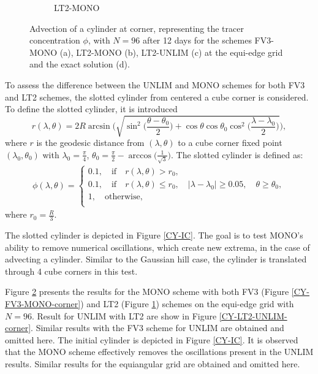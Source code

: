 \documentclass[preprint,12pt]{elsarticle}
\begin{document}
\begin{linenumbers}
\begin{figure}[!htb]
\begin{subfigure}{0.45\textwidth}
		\caption{LT2-MONO\label{CY-LT2-MONO-corner}}
	\end{subfigure}
	\caption{Advection of a cylinder at corner, representing the tracer concentration $\phi$, with $N= 96$ after 12 days for the schemes FV3-MONO (a), LT2-MONO (b), LT2-UNLIM (c) at the equi-edge grid and the exact solution (d).}
	\label{CY-corner}
\end{figure}
To assess the difference between the UNLIM and MONO schemes for both FV3 and LT2 schemes, the slotted cylinder from \cite{nair:2010} centered a cube corner is considered.
To define the slotted cylinder, it is introduced
\begin{equation}
	r(\lambda, \theta)=2R \arcsin{\bigg(
		\sqrt{\sin^2{\bigg(\frac{\theta-\theta_0}{2}\bigg)} + \cos{\theta}\cos{\theta_0}\cos^2{\bigg(\frac{\lambda-\lambda_0}{2}\bigg)}}\bigg)},
\end{equation}
where $r$ is the geodesic distance from $(\lambda, \theta)$ to a cube corner fixed point  $(\lambda_0, \theta_0)$ with 
$\lambda_0 =\frac{\pi}{4}$, $\theta_0= \frac{\pi}{2}-\arccos{\big(\frac{1}{\sqrt{3}}\big)}$.
The slotted cylinder is defined as:
\begin{align}
	\label{slotted-cylinder}
	\phi(\lambda,\theta) =
	\begin{cases}
		0.1, \quad \text{if} \quad r(\lambda,\theta) > r_0,\\
		0.1, \quad \text{if} \quad r(\lambda,\theta) \le r_0, \quad
		|\lambda-\lambda_0| \ge 0.05, \quad \theta\ge\theta_0,\\
		1, \quad \text{otherwise},\\
	\end{cases}
\end{align}
where $r_0=\frac{R}{3}$.

The slotted cylinder is depicted in Figure \ref{CY-IC}.
The goal is to test MONO's ability to remove numerical oscillations, which create new extrema, in the case of advecting a cylinder.
Similar to the Gaussian hill case, the cylinder is translated through 4 cube corners in this test.

Figure \ref{CY-corner} presents the results for the MONO  scheme with both FV3 (Figure \ref{CY-FV3-MONO-corner}) and LT2 (Figure \ref{CY-LT2-MONO-corner}) schemes on the equi-edge grid with $N=96$.
Result for UNLIM with LT2 are show in Figure \ref{CY-LT2-UNLIM-corner}.
Similar results with the FV3 scheme for UNLIM are obtained and omitted here.
The initial cylinder is depicted in Figure \ref{CY-IC}.
It is observed that the MONO scheme effectively removes the oscillations present in the UNLIM results.
Similar results for the equiangular grid are obtained and omitted here.


\end{linenumbers}
\end{document}
